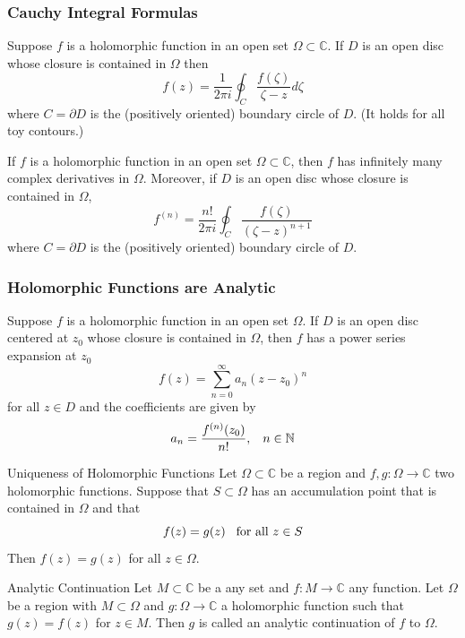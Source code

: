 \documentclass{beamer}
\begin{document}
\begin{frame}
\frametitle{Cauchy Integral Formulas}
Suppose $f$ is a holomorphic function in an open set $\Omega\subset\mathbb{C}$. If $D$ is an open disc whose closure is contained in $\Omega$ then
$$f(z)=\dfrac{1}{2\pi i}\oint_C\dfrac{f(\zeta)}{\zeta-z}d\zeta$$
where $C=\partial D$ is the (positively oriented) boundary circle of $D$. (It holds for all toy contours.)
\begin{block}{}
If $f$ is a holomorphic function in an open set $\Omega\subset\mathbb{C}$, then $f$ has infinitely many complex derivatives in $\Omega$. Moreover, if $D$ is an open disc whose closure is contained in $\Omega$,
$$f^{(n)}=\dfrac{n!}{2\pi i}\oint_C\dfrac{f(\zeta)}{(\zeta-z)^{n+1}}$$
where $C=\partial D$ is the (positively oriented) boundary circle of $D$.
\end{block}
\end{frame}

\begin{frame}
\frametitle{Holomorphic Functions are Analytic}
Suppose $f$ is a holomorphic function in an open set $\Omega$. If $D$ is an open disc centered at $z_0$ whose closure is contained in $\Omega$, then $f$ has a power series expansion at $z_0$
$$f(z)=\sum\limits_{n=0}^{\infty}a_n(z-z_0)^n$$
for all $z\in D$ and the coefficients are given by
$$a_n=\dfrac{f^{(n)}(z_0)}{n!},\hspace{3mm}n\in\mathbb{N}$$
\end{frame}


\begin{frame}
\begin{block}{Uniqueness of Holomorphic Functions}
Let $\Omega\subset\mathbb{C}$ be a region and $f,g:\Omega\rightarrow\mathbb{C}$ two holomorphic functions. Suppose that $S\subset\Omega$ has an accumulation point that is contained in $\Omega$ and that
$$f(z)=g(z)\hspace{3mm}\text{for all }z\in S$$
Then $f(z)=g(z)$ for all $z\in\Omega$.
\end{block}
\begin{block}{Analytic Continuation}
Let $M\subset\mathbb{C}$ be a any set and $f:M\rightarrow\mathbb{C}$ any function. Let $\Omega$ be a region with $M\subset\Omega$ and $g:\Omega\rightarrow\mathbb{C}$ a holomorphic function such that $g(z)=f(z)$ for $z\in M$. Then $g$ is called an analytic continuation of $f$ to $\Omega$.
\end{block}
\end{frame}
\end{document}
